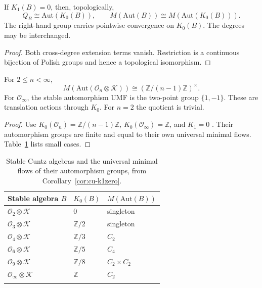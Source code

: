 \begin{corollary}\label{cor:cu-k1zero}
 If $K_1(B)=0$, then, topologically, 
\begin{equation*}
Q_B\cong\mathrm{Aut}(K_0(B)),\qquad M(\mathrm{Aut}(B))\cong M(\mathrm{Aut}(K_0(B))).
\end{equation*}
The right-hand group carries pointwise convergence on $K_0(B)$. The degrees
may be interchanged.
\end{corollary}

\begin{proof}
Both cross-degree extension terms vanish. Restriction is a continuous
bijection of Polish groups and hence a topological isomorphism.
\end{proof}

\begin{corollary}\label{cor:cu-cuntz-stable}
 For $2\leq n<\infty$, 
\begin{equation*}
M(\mathrm{Aut}(\mathcal{O}_n\otimes\mathcal{K})) \cong(\mathbb{Z}/(n-1)\mathbb{Z})^\times.
\end{equation*}
For $\mathcal{O}_\infty$, the stable automorphism UMF is the two-point group 
$\{1,-1\}$. These are translation actions through $K_0$. For $n=2$ the
quotient is trivial.
\end{corollary}

\begin{proof}
Use $K_0(\mathcal{O}_n)=\mathbb{Z}/(n-1)\mathbb{Z}$, $K_0(\mathcal{O}_\infty)=\mathbb{Z}$, and $K_1=0$ \cite{Cuntz1981}. Their automorphism groups
are finite and equal to their own universal minimal flows. Table~\ref{eq:cu-cuntz} lists small cases.
\end{proof}

\begin{table}[ht]
\centering
\begin{tabular}{lll}
\hline Stable algebra $B$ & $K_0(B)$ & $M(\mathrm{Aut}(B))$ \\ 
\hline $\mathcal{O}_2\otimes\mathcal{K}$ & $0$ & singleton \\ 
$\mathcal{O}_3\otimes\mathcal{K}$ & $\mathbb{Z}/2$ & singleton \\ 
$\mathcal{O}_4\otimes\mathcal{K}$ & $\mathbb{Z}/3$ & $C_2$ \\ 
$\mathcal{O}_6\otimes\mathcal{K}$ & $\mathbb{Z}/5$ & $C_4$ \\ 
$\mathcal{O}_9\otimes\mathcal{K}$ & $\mathbb{Z}/8$ & $C_2\times C_2$ \\ 
$\mathcal{O}_\infty\otimes\mathcal{K}$ & $\mathbb{Z}$ & $C_2$ \\ 
\hline &  & 
\end{tabular}\caption{Stable Cuntz algebras and the universal minimal flows of their
automorphism groups, from Corollary~\protect\ref{cor:cu-k1zero}.}
\label{eq:cu-cuntz}
\end{table}

